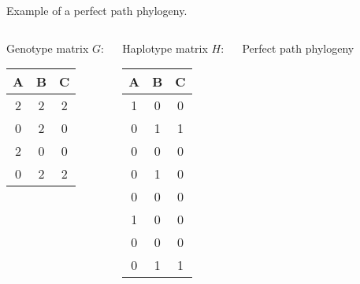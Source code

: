 \documentclass{beamer}
\begin{document}
\begin{frame}{Example of a perfect path phylogeny.}
  \begin{columns}[t]
    \begin{exampleblock}{Genotype matrix}
      $G\colon$
      \begin{tabular}{ccc}
        A & B & C \\\hline
        2 & 2 & 2 \\
        0 & 2 & 0 \\
        2 & 0 & 0 \\
        0 & 2 & 2 
      \end{tabular}
    \end{exampleblock}

    \begin{exampleblock}{Haplotype matrix}
      $H\colon$
      \begin{tabular}{ccc}
        A & B & C \\\hline
        1 & 0 & 0 \\
        0 & 1 & 1 \\
        0 & 0 & 0 \\
        0 & 1 & 0 \\
        0 & 0 & 0 \\
        1 & 0 & 0 \\
        0 & 0 & 0 \\
        0 & 1 & 1 
      \end{tabular}
    \end{exampleblock}

    \begin{exampleblock}{Perfect path phylogeny}
      \begin{center}
      \end{center}
    \end{exampleblock}
  \end{columns}
\end{frame}
\end{document}
